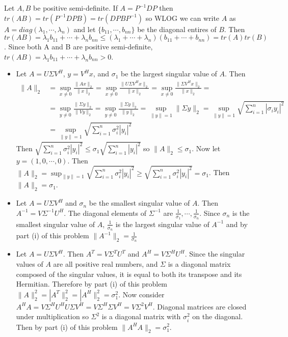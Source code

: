 \documentclass[12pt]{article}
\newenvironment{problem}[2][Problem]{\begin{trivlist}
\item[\hskip \labelsep {\bfseries #1}\hskip \labelsep {\bfseries #2}]}{\end{trivlist}}
\begin{document}
 
\begin{problem}{28.} 
Let $A,B$ be positive semi-definite. If $A = P^{-1}DP$ then $tr(AB)  = tr(P^{-1}DPB) = tr(DPBP^{-1})$ so WLOG we can write $A$ as  $A = diag(\lambda_1,\cdots, \lambda_n)$ and let $\{b_{11}, \cdots ,b_{nn}\}$ be the diagonal entires of $B$. Then $tr(AB) = \lambda_1b_{11} + \cdots + \lambda_nb_{nn}
\leq (\lambda_1 + \cdots + \lambda_n)(b_{11} + \cdots +b_{nn})= tr(A)tr(B)$. Since both A and B are positive semi-definite, $tr(AB) = \lambda_1b_{11} + \cdots + \lambda_nb_{nn} > 0$. 
\end{problem}


\begin{problem}{31.} \hfill
\begin{itemize}
\item [(i)] Let $A = U\Sigma V^H$, $y = V^Hx$, and $\sigma_1$ be the largest singular value of $A$. Then 
\begin{equation*}
\begin{aligned}
\|A\|_2 &= \sup_{x\neq 0} \frac{\|Ax\|_2}{\|x\|_2} = \sup_{x\neq 0} \frac{\|U\Sigma V^Hx\|_2}{\|x\|_2} = \sup_{x\neq 0} \frac{\|\Sigma V^Hx\|_2}{\|x\|_2} = \\
& = \sup_{y\neq 0} \frac{\|\Sigma y\|_2}{\|Vy\|_2} = \sup_{y\neq 0} \frac{\|\Sigma y\|_2}{\|y\|_2} =  \sup_{\|y\|= 1} \|\Sigma y\|_2 = 
\sup_{\|y\|=1} \sqrt{\sum_{i=1}^n |\sigma_i y_i|^2}\\
 &= \sup_{\|y\|=1} \sqrt{\sum_{i=1}^n \sigma_i^2| y_i|^2}
\end{aligned}
\end{equation*}
Then $\sqrt{\sum_{i=1}^n \sigma_i^2| y_i|^2} \leq \sigma_1 \sqrt{\sum_{i=1}^n |y_i|^2}$ so $\| A \|_2 \leq \sigma_1$.  Now let $y = (1,0, \cdots,0)$. Then $ \|A\|_2 =  \sup_{\|y\|=1} \sqrt{\sum_{i=1}^n \sigma_i^2| y_i|^2}\geq \sqrt{\sum_{i=1}^n \sigma_i^2| y_i|^2} = \sigma_1$. Then $\|A\|_2 = \sigma_1$. 
\item [(ii)] Let $A = U\Sigma V^H$ and $\sigma_n$ be the smallest singular value of $A$. Then $A^{-1} = V\Sigma^{-1} U^H$. The diagonal elements of $\Sigma^{-1}$ are $\frac{1}{\sigma_1}, \cdots, \frac{1}{\sigma_n}$. Since $\sigma_n$ is the smallest singular value of $A$, $\frac{1}{\sigma_n}$ is the largest singular value of $A^{-1}$ and by part (i) of this problem $\|A^{-1}\|_2 = \frac{1}{\sigma_n}$
\item [(iii)] Let $A = U\Sigma V^H$. Then $A^T = V\Sigma^T U^T$ and $A^H = V\Sigma^H U^H$. Since the singular values of $A$ are all positive real numbers, and $\Sigma$ is a diagonal matrix composed of the singular values, it is equal to both its transpose and its Hermitian. Therefore by part (i) of this problem $\|A\|_2^2 = |A^T\|_2^2 = |A^H\|_2^2 = \sigma_1^2$.  Now consider $A^HA = V\Sigma^H U^HU\Sigma V^H = V\Sigma^H\Sigma V^H = V\Sigma^2V^H$. Diagonal matrices are closed under multiplication so $\Sigma^2$ is a diagonal matrix with $\sigma_i^2$ on the diagonal. Then by part (i) of this problem $\|A^HA\|_2 = \sigma_1^2$. 

\end{itemize}
\end{problem}
\end{document}
